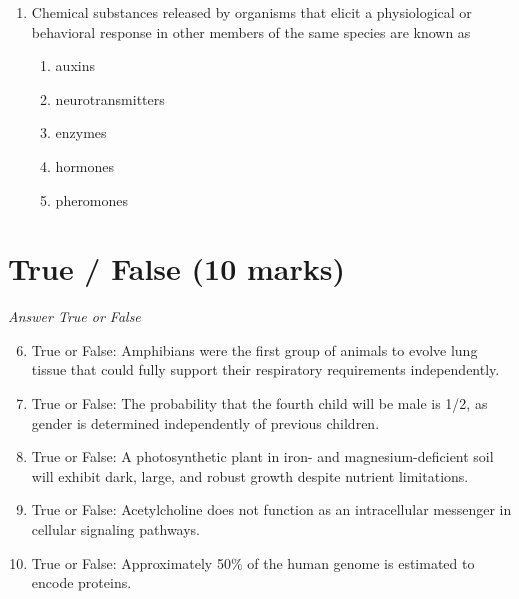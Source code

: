 \documentclass[12pt]{article}
\begin{document}
\begin{enumerate}[label=\arabic*.]
\begin{enumerate}[label=(\alph*)]
    \item RNAse H
    \item Helicase
    \item integrase
    \item DNA ligase
    \item protease
\end{enumerate}
\item Chemical substances released by organisms that elicit a physiological or behavioral response in other members of the same species are known as
\begin{enumerate}[label=(\alph*)]
    \item auxins
    \item neurotransmitters
    \item enzymes
    \item hormones
    \item pheromones
\end{enumerate}
\end{enumerate}

\section*{True / False (10 marks)}
\textit{Answer True or False}
\begin{enumerate}[label=\arabic*.]
\setcounter{enumi}{5}
\item True or False: Amphibians were the first group of animals to evolve lung tissue that could fully support their respiratory requirements independently.
\item True or False: The probability that the fourth child will be male is 1/2, as gender is determined independently of previous children.
\item True or False: A photosynthetic plant in iron- and magnesium-deficient soil will exhibit dark, large, and robust growth despite nutrient limitations.
\item True or False: Acetylcholine does not function as an intracellular messenger in cellular signaling pathways.
\item True or False: Approximately 50\% of the human genome is estimated to encode proteins.
\end{enumerate}
\end{document}
